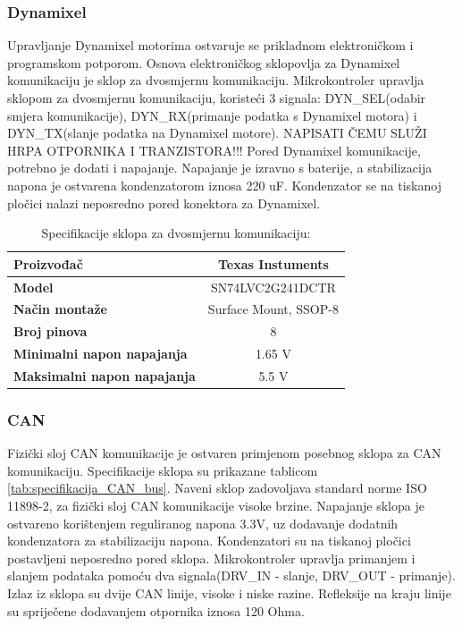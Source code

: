 \documentclass[11pt,a4paper]{article}
\begin{document}
\subsubsection{Dynamixel}
Upravljanje Dynamixel motorima ostvaruje se prikladnom elektroničkom i programskom potporom. Osnova elektroničkog sklopovlja za Dynamixel komunikaciju je sklop za dvosmjernu komunikaciju. Mikrokontroler upravlja sklopom za dvosmjernu komunikaciju, koristeći 3 signala: DYN\_SEL(odabir smjera komunikacije), DYN\_RX(primanje podatka s Dynamixel motora) i DYN\_TX(slanje podatka na Dynamixel motore). NAPISATI ČEMU SLUŽI HRPA OTPORNIKA I TRANZISTORA!!! Pored Dynamixel komunikacije, potrebno je dodati i napajanje. Napajanje je izravno s baterije, a stabilizacija napona je ostvarena kondenzatorom iznosa 220 uF. Kondenzator se na tiskanoj pločici nalazi neposredno pored konektora za Dynamixel.

\begin{table}[H]
	\centering
	\caption{Specifikacije sklopa za dvosmjernu komunikaciju: }
	\label{tab:specifikacija_dynamixel_buffer}
	\begin{tabular}{|l|c|}
		\hline
		\textbf{Proizvođač} & Texas Instuments \\ \hline 
		\textbf{Model} & SN74LVC2G241DCTR \\ \hline 
		\textbf{Način montaže} & Surface Mount, SSOP-8 \\ \hline 
		\textbf{Broj pinova} & 8 \\ \hline 
		\textbf{Minimalni napon napajanja} & 1.65 V \\ \hline 
		\textbf{Maksimalni napon napajanja} & 5.5 V    \\ \hline
	\end{tabular}
\end{table}


\subsubsection{CAN}
Fizički sloj CAN komunikacije je ostvaren primjenom posebnog sklopa za CAN komunikaciju. Specifikacije sklopa su prikazane tablicom \ref{tab:specifikacija_CAN_bus}. Naveni sklop zadovoljava standard norme ISO 11898-2, za fizički sloj CAN komunikacije visoke brzine. Napajanje sklopa je ostvareno korištenjem reguliranog napona 3.3V, uz dodavanje dodatnih kondenzatora za stabilizaciju napona. Kondenzatori su na tiskanoj pločici postavljeni neposredno pored sklopa. Mikrokontroler upravlja primanjem i slanjem podataka pomoću dva signala(DRV\_IN - slanje, DRV\_OUT - primanje). Izlaz iz sklopa su dvije CAN linije, visoke i niske razine. Refleksije na kraju linije su spriječene dodavanjem otpornika iznosa 120 Ohma.
\end{document}
